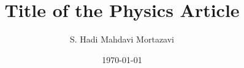 \documentclass[
  aps,
  prd,
  reprint,
  superscriptaddress,
  nofootinbib,
  longbibliography
]{revtex4-2}
\begin{document}
\title{Title of the Physics Article}

\author{S. Hadi Mahdavi Mortazavi}
\date{\today}

\begin{abstract}

\end{abstract}

\maketitle









\appendix





\end{document}
